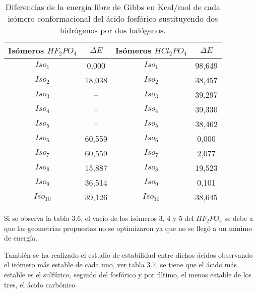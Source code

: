 \begin{table}[H]
	\centering
	\begin{tabular}{|c|c|c|c|}
		\hline
		Isómeros $HF_2PO_4$ & $\Delta E$   & Isómeros $HCl_2PO_4$ & $\Delta E$     \\ \hline
		$Iso_1$  & 0,000     & $Iso_1$     & 98,649 \\ \hline
		$Iso_2$  & 18,038    & $Iso_2$   & 38,457 \\ \hline
		$Iso_3$   & -- & $Iso_3$    & 39,297 \\ \hline
		$Iso_4$   & --& $Iso_4$    & 39,330 \\ \hline
		$Iso_5$   & -- & $Iso_5$  & 38,462 \\ \hline
		$Iso_6$    & 60,559    & $Iso_6$  & 0,000  \\ \hline
		$Iso_7$   & 60,559    & $Iso_7$   & 2,077  \\ \hline
		$Iso_8$    & 15,887    & $Iso_8$  & 19,523 \\ \hline
		$Iso_9$   & 36,514    & $Iso_9$   & 0,101  \\ \hline
		$Iso_{10}$  & 39,126    & $Iso_{10}$   & 38,645 \\ \hline
	\end{tabular}
\caption{Diferencias de la energía libre de Gibbs en Kcal/mol de cada isómero conformacional del ácido fosfórico sustituyendo dos hidrógenos por dos halógenos.}
\end{table}

Si se observa la tabla 3.6, el vacío de los isómeros 3, 4 y 5 del $HF_2PO_4$ se debe a que las geometrías propuestas no se optimizaron ya que no se llegó a un mínimo de energía.


También se ha realizado el estudio de estabilidad entre dichos ácidos observando el isómero más estable de cada uno, ver tabla 3.7, se tiene que el ácido más estable es el sulfúrico, seguido del fosfórico y por último, el menos estable de los tres, el ácido carbónico \\

